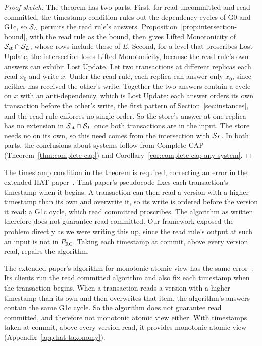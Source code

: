 \begin{proof}[Proof sketch]
The theorem has two parts.  First, for read uncommitted and read committed,
the timestamp condition rules out the dependency cycles of G0 and G1c, so
$\mathcal{S}_L$ permits the read rule's answers.
Proposition~\ref{prop:intersection-bound}, with the read rule as the bound,
then gives Lifted Monotonicity of $\mathcal{S}_{\mathrm{st}}\cap\mathcal{S}_L$, whose rows
include those of $E$.  Second, for a level that proscribes Lost Update, the
intersection loses Lifted Monotonicity, because the read rule's own answers can
exhibit Lost Update.  Let two transactions at different replicas each read
$x_0$ and write $x$.  Under the read rule, each replica can answer only $x_0$,
since neither has received the other's write.  Together the two answers contain
a cycle on $x$ with an anti-dependency, which is Lost Update: each answer
orders its own transaction before the other's write, the first pattern of
Section~\ref{sec:instances}, and the read rule enforces no single order.  So
the store's
answer at one replica has no extension in $\mathcal{S}_{\mathrm{st}}\cap\mathcal{S}_L$ once
both transactions are in the input.  The store needs no \commitment on its own,
so this need comes from the intersection with $\mathcal{S}_L$.  In both parts, the
conclusions about systems follow from Complete CAP
(Theorem~\ref{thm:complete-cap}) and
Corollary~\ref{cor:complete-cap-any-system}.
\end{proof}

The timestamp condition in the theorem is required, correcting an error in the
extended HAT paper~\cite{bailis2013hatextended}.  That paper's pseudocode
fixes each transaction's timestamp when it begins.  A transaction can then read
a version with a higher timestamp than its own and overwrite it, so its write
is ordered before the version it read: a G1c cycle, which read committed
proscribes.  The algorithm as written therefore does not guarantee read
committed.  Our framework exposed the problem directly as we were writing this
up, since the read rule's output at such an input is not in $P_{\mathrm{RC}}$.
Taking each timestamp at commit, above every version read, repairs the
algorithm.

The extended paper's algorithm for monotonic atomic view has the same
error~\cite[App.~B]{bailis2013hatextended}.  Its clients run the read committed
algorithm and also fix each timestamp when the transaction begins.  When a
transaction reads a version with a higher timestamp than its own and then
overwrites that item, the algorithm's answers contain the same G1c cycle.  So
the algorithm does not guarantee read committed, and therefore not monotonic
atomic view either.  With timestamps taken at commit, above every version
read, it provides monotonic atomic view (Appendix~\ref{app:hat-taxonomy}).

